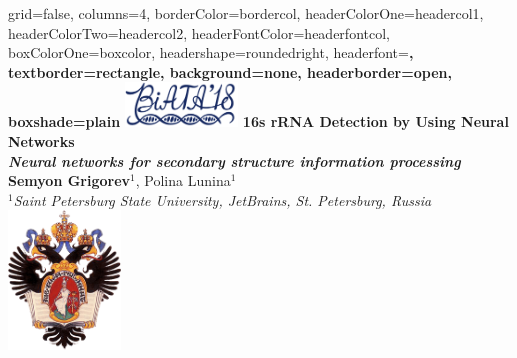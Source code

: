 \documentclass[a0paper,portrait]{baposter}
\begin{document}
\begin{poster}{
grid=false,
columns=4,
borderColor=bordercol, %
headerColorOne=headercol1, %
headerColorTwo=headercol2, %
headerFontColor=headerfontcol, %
boxColorOne=boxcolor, %
headershape=roundedright, %
headerfont=\Large\sf\bf, %
textborder=rectangle,
background=none,
headerborder=open, %
boxshade=plain
}
{\includegraphics[width=3cm]{BiAtA2018.png}}
%
%
{ \bf  \huge {16s rRNA Detection by Using Neural Networks} \\  \Large \it Neural networks for secondary structure information processing} %
{\vspace{0.3em} \smaller \textbf{Semyon Grigorev$^1$}, Polina Lunina$^1$ \\  %
\smaller \it $^1${Saint Petersburg State University, JetBrains, St. Petersburg, Russia } \\ %
}
{\includegraphics[width=3cm]{SPbGU_Logo.png}} %


\end{poster}
\end{document}
